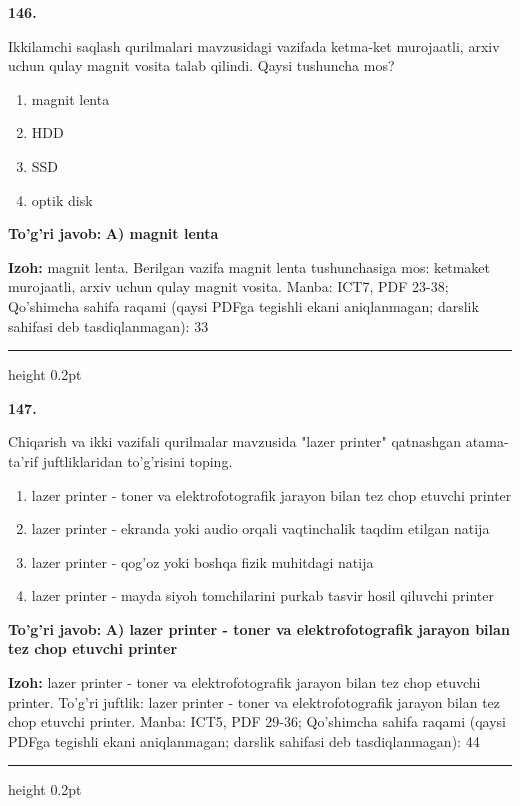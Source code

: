 \documentclass[10pt,a4paper]{article}
\begin{document}
{\bfseries\sffamily\color{ink} 146.}
\par
Ikkilamchi saqlash qurilmalari mavzusidagi vazifada ketma-ket murojaatli, arxiv uchun qulay magnit vosita talab qilindi. Qaysi tushuncha mos?
\begin{enumerate}[label=\Alph*),leftmargin=9mm]
\item magnit lenta
\item HDD
\item SSD
\item optik disk
\end{enumerate}
\begin{tcolorbox}[enhanced,breakable,colback=teal!4,colframe=teal!60!black,boxrule=0.45pt,arc=1.2mm,left=2.7mm,right=2.7mm,top=1.8mm,bottom=1.8mm,before skip=2mm,after skip=2mm]
{\bfseries\sffamily\color{teal}To'g'ri javob:} \textbf{A) magnit lenta}
\par\smallskip
{\bfseries Izoh:} magnit lenta. Berilgan vazifa magnit lenta tushunchasiga mos: ketmaket murojaatli, arxiv uchun qulay magnit vosita. Manba: ICT7, PDF 23-38; Qo'shimcha sahifa raqami (qaysi PDFga tegishli ekani aniqlanmagan; darslik sahifasi deb tasdiqlanmagan): 33
\end{tcolorbox}
\vspace{2mm}\hrule height 0.2pt\vspace{3mm}

{\bfseries\sffamily\color{ink} 147.}
\par
Chiqarish va ikki vazifali qurilmalar mavzusida "lazer printer" qatnashgan atama-ta'rif juftliklaridan to'g'risini toping.
\begin{enumerate}[label=\Alph*),leftmargin=9mm]
\item lazer printer - toner va elektrofotografik jarayon bilan tez chop etuvchi printer
\item lazer printer - ekranda yoki audio orqali vaqtinchalik taqdim etilgan natija
\item lazer printer - qog'oz yoki boshqa fizik muhitdagi natija
\item lazer printer - mayda siyoh tomchilarini purkab tasvir hosil qiluvchi printer
\end{enumerate}
\begin{tcolorbox}[enhanced,breakable,colback=teal!4,colframe=teal!60!black,boxrule=0.45pt,arc=1.2mm,left=2.7mm,right=2.7mm,top=1.8mm,bottom=1.8mm,before skip=2mm,after skip=2mm]
{\bfseries\sffamily\color{teal}To'g'ri javob:} \textbf{A) lazer printer - toner va elektrofotografik jarayon bilan tez chop etuvchi printer}
\par\smallskip
{\bfseries Izoh:} lazer printer - toner va elektrofotografik jarayon bilan tez chop etuvchi printer. To'g'ri juftlik: lazer printer - toner va elektrofotografik jarayon bilan tez chop etuvchi printer. Manba: ICT5, PDF 29-36; Qo'shimcha sahifa raqami (qaysi PDFga tegishli ekani aniqlanmagan; darslik sahifasi deb tasdiqlanmagan): 44
\end{tcolorbox}
\vspace{2mm}\hrule height 0.2pt\vspace{3mm}
\end{document}
